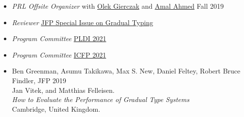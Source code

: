 \documentclass{article}
\begin{document}
\begin{itemize}
  \item \emph{PRL Offsite Organizer} with \href{https://www.khoury.northeastern.edu/people/olek-gierczak/}{Olek Gierczak} and \href{http://ccs.neu.edu/home/amal/}{Amal Ahmed} \hfill {Fall 2019}
  \item \emph{Reviewer} \hfill \href{https://www.cambridge.org/core/news/jfp-special-issue-on-gradual-typing}{JFP Special Issue on Gradual Typing}
  \item \emph{Program Committee} \hfill \href{https://pldi21.sigplan.org/committee/pldi-2021-papers-program-committee}{PLDI 2021}
  \item \emph{Program Committee} \hfill \href{https://icfp21.sigplan.org/committee/icfp-2021-papers-program-committee}{ICFP 2021}
\end{itemize}


\newpage
{}

\begin{itemize}
\item
  Ben Greenman, Asumu Takikawa, Max S. New, Daniel Feltey, Robert Bruce Findler, \hfill JFP 2019 \\
  Jan Vitek, and Matthias Felleisen. \\
  \emph{How to Evaluate the Performance of Gradual Type Systems} \\
  Cambridge, United Kingdom.
\end{itemize}
\end{document}

